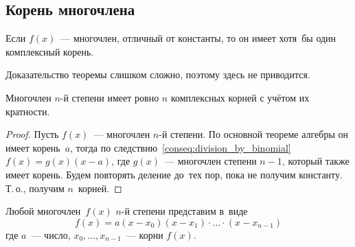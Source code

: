 \subsection{Корень многочлена}
\begin{theorem}
\label{th:fundamental_th_of_algebra}
Если $f(x)$~--- многочлен, отличный от константы, то он имеет хотя~бы один комплексный корень.
\end{theorem}%
Доказательство теоремы слишком сложно, поэтому здесь не приводится.

\begin{consequent}
\label{conseq:n_roots_of_polynomial}
Многочлен $n$\nobreakdash-й степени имеет ровно $n$ комплексных корней с учётом их кратности.
\end{consequent}
\begin{proof}
Пусть $f(x)$~--- многочлен $n$\nobreakdash-й степени.
По основной теореме алгебры он имеет корень~$a$, тогда по следствию~\ref*{conseq:division_by_binomial} $f(x) = g(x)(x - a)$, где $g(x)$~--- многочлен степени $n - 1$, который также имеет корень.
Будем повторять деление до~тех пор, пока не получим константу.
Т.\,о., получим $n$~корней.
\end{proof}

\begin{consequent}
Любой многочлен~$f(x)$ $n$\nobreakdash-й степени представим в~виде
\begin{equation*}
f(x) = a(x - x_0)(x - x_1) \cdot \ldots \cdot (x - x_{n-1})
\end{equation*}
где $a$~--- число, $x_0, \ldots, x_{n-1}$~--- корни $f(x)$.
\end{consequent}

